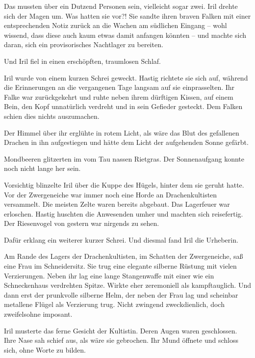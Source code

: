 Das mussten über ein Dutzend Personen sein, vielleicht sogar zwei. Iril drehte sich der Magen um. Was hatten sie vor?! Sie sandte ihren braven Falken mit einer entsprechenden Notiz zurück an die Wachen am südlichen Eingang – wohl wissend, dass diese auch kaum etwas damit anfangen könnten – und machte sich daran, sich ein provisorisches Nachtlager zu bereiten.

Und Iril fiel in einen erschöpften, traumlosen Schlaf.



\trennzeichen



Iril wurde von einem kurzen Schrei geweckt. Hastig richtete sie sich auf, während die Erinnerungen an die vergangenen Tage langsam auf sie einprasselten. Ihr Falke war zurückgekehrt und ruhte neben ihrem dürftigen Kissen, auf einem Bein, den Kopf unnatürlich verdreht und in sein Gefieder gesteckt. Dem Falken schien dies nichts auszumachen.

Der Himmel über ihr erglühte in rotem Licht, als wäre das Blut des gefallenen Drachen in ihn aufgestiegen und hätte dem Licht der aufgehenden Sonne gefärbt.

Mondbeeren glitzerten im vom Tau nassen Rietgras. Der Sonnenaufgang konnte noch nicht lange her sein.

Vorsichtig blinzelte Iril über die Kuppe des Hügels, hinter dem sie geruht hatte. Vor der Zwergeneiche war immer noch eine Horde an Drachenkultisten versammelt. Die meisten Zelte waren bereits abgebaut. Das Lagerfeuer war erloschen. Hastig huschten die Anwesenden umher und machten sich reisefertig. Der Riesenvogel von gestern war nirgends zu sehen.

Dafür erklang ein weiterer kurzer Schrei. Und diesmal fand Iril die Urheberin.

Am Rande des Lagers der Drachenkultisten, im Schatten der Zwergeneiche, saß eine Frau im Schneidersitz. Sie trug eine elegante silberne Rüstung mit vielen Verzierungen. Neben ihr lag eine lange Stangenwaffe mit einer wie ein Schneckenhaus verdrehten Spitze. Wirkte eher zeremoniell als kampftauglich. Und dann erst der prunkvolle silberne Helm, der neben der Frau lag und scheinbar metallene Flügel als Verzierung trug. Nicht zwingend zweckdienlich, doch zweifelsohne imposant.

Iril musterte das ferne Gesicht der Kultistin. Deren Augen waren geschlossen. Ihre Nase sah schief aus, als wäre sie gebrochen. Ihr Mund öffnete und schloss sich, ohne Worte zu bilden.

